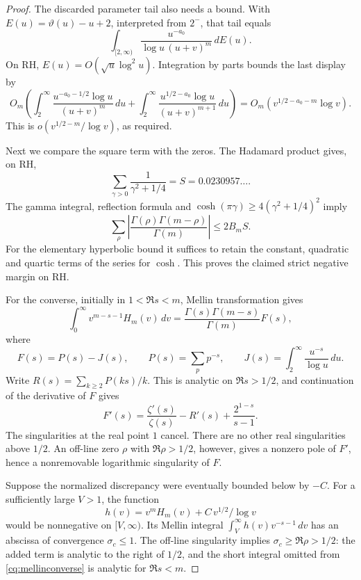 \begin{proof}
The discarded parameter tail also needs a bound. With
\(E(u)=\vartheta(u)-u+2\), interpreted from \(2^-\), that tail equals
\[
 \int_{[2,\infty)}
 \frac{u^{-a_0}}{\log u\,(u+v)^m}\,dE(u).
\]
On RH, \(E(u)=O(\sqrt u\log^2u)\). Integration by parts bounds the last
display by
\[
 O_m\!\left(
 \int_2^\infty\frac{u^{-a_0-1/2}\log u}{(u+v)^m}\,du+
 \int_2^\infty\frac{u^{1/2-a_0}\log u}{(u+v)^{m+1}}\,du\right)
 =O_m(v^{1/2-a_0-m}\log v).
\]
This is \(o(v^{1/2-m}/\log v)\), as required.

Next we compare the square term with the zeros. The Hadamard product gives,
on RH,
\[
 \sum_{\gamma>0}\frac{1}{\gamma^2+1/4}=S=0.0230957\ldots .
\]
The gamma integral, reflection formula and
\(\cosh(\pi\gamma)\geq4(\gamma^2+1/4)^2\) imply
\[
 \sum_\rho\left|
 \frac{\Gamma(\rho)\Gamma(m-\rho)}{\Gamma(m)}
 \right|\leq 2B_m S .
\]
For the elementary hyperbolic bound it suffices to retain the constant,
quadratic and quartic terms of the series for \(\cosh\).
This proves the claimed strict negative margin on RH.

For the converse, initially in \(1<\Re s<m\), Mellin transformation gives
\begin{equation}\label{cq:mellinconverse}
 \int_0^\infty v^{m-s-1}H_m(v)\,dv
 =\frac{\Gamma(s)\Gamma(m-s)}{\Gamma(m)}F(s),
\end{equation}
where
\[
 F(s)=P(s)-J(s),\qquad
 P(s)=\sum_pp^{-s},\qquad
 J(s)=\int_2^\infty\frac{u^{-s}}{\log u}\,du .
\]
Write \(R(s)=\sum_{k\geq2}P(ks)/k\). This is analytic on \(\Re s>1/2\), and
continuation of the derivative of \(F\) gives
\begin{equation}\label{cq:Fderivative}
 F'(s)=\frac{\zeta'(s)}{\zeta(s)}-R'(s)+\frac{2^{1-s}}{s-1}.
\end{equation}
The singularities at the real point \(1\) cancel. There are no other real
singularities above \(1/2\). An off-line zero \(\rho\) with
\(\Re\rho>1/2\), however, gives a nonzero pole of \(F'\), hence a
nonremovable logarithmic singularity of \(F\).

Suppose the normalized discrepancy were eventually bounded below by \(-C\).
For a sufficiently large \(V>1\), the function
\[
 h(v)=v^m H_m(v)+C\,v^{1/2}/\log v
\]
would be nonnegative on \([V,\infty)\). Its Mellin integral
\(\int_V^\infty h(v)v^{-s-1}\,dv\) has an abscissa of convergence
\(\sigma_c\leq1\). The off-line singularity implies
\(\sigma_c\geq\Re\rho>1/2\): the added term is analytic to the right of
\(1/2\), and the short integral omitted from \eqref{cq:mellinconverse}
is analytic for \(\Re s<m\).


\end{proof}
